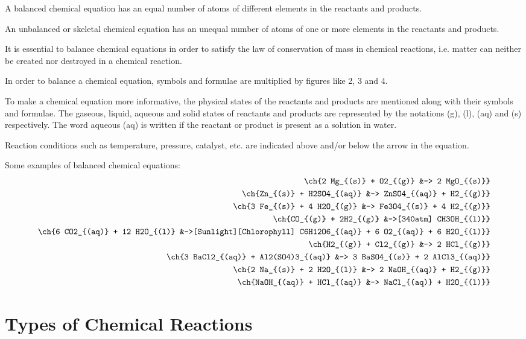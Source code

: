 \begin{outline}
    \1 A balanced chemical equation has an equal number of atoms of different elements in the reactants and products. 
    
    \1 An unbalanced or skeletal chemical equation has an unequal number of atoms of one or more elements in the reactants and products.

    \1 It is essential to balance chemical equations in order to satisfy the law of conservation of mass in chemical reactions, i.e. matter can neither be created nor destroyed in a chemical reaction.

    \1 In order to balance a chemical equation, symbols and formulae are multiplied by figures like 2, 3 and 4.

    \1 To make a chemical equation more informative, the physical states of the reactants and products are mentioned along with their symbols and formulae. The gaseous, liquid, aqueous and solid states of reactants and products are represented by the notations (g), (l), (aq) and (s) respectively. The word aqueous (aq) is written if the reactant or product is present as a solution in water.

    \1 Reaction conditions such as temperature, pressure, catalyst, etc. are indicated above and/or below the arrow in the equation.

    \1 Some examples of balanced chemical equations:
    \begin{align*}
        \ch{2 Mg_{(s)} + O2_{(g)} &-> 2 MgO_{(s)}} \\
        \ch{Zn_{(s)} + H2SO4_{(aq)} &-> ZnSO4_{(aq)} + H2_{(g)}} \\
        \ch{3 Fe_{(s)} + 4 H2O_{(g)} &-> Fe3O4_{(s)} + 4 H2_{(g)}} \\
        \ch{CO_{(g)} + 2H2_{(g)} &->[340atm] CH3OH_{(l)}} \\
        \ch{6 CO2_{(aq)} + 12 H2O_{(l)} &->[Sunlight][Chlorophyll] C6H12O6_{(aq)} + 6 O2_{(aq)} + 6 H2O_{(l)}} \\
        \ch{H2_{(g)} + Cl2_{(g)} &-> 2 HCl_{(g)}} \\
        \ch{3 BaCl2_{(aq)} + Al2(SO4)3_{(aq)} &-> 3 BaSO4_{(s)} + 2 AlCl3_{(aq)}} \\
        \ch{2 Na_{(s)} + 2 H2O_{(l)} &-> 2 NaOH_{(aq)} + H2_{(g)}} \\
        \ch{NaOH_{(aq)} + HCl_{(aq)} &-> NaCl_{(aq)} + H2O_{(l)}}
    \end{align*}
\end{outline}

\section{Types of Chemical Reactions}

